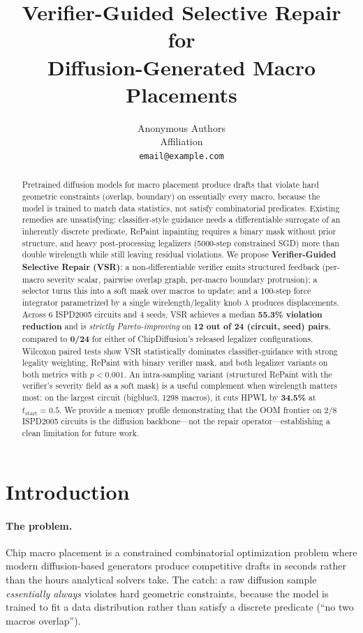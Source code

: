 \documentclass{article}
\title{Verifier-Guided Selective Repair for\\ Diffusion-Generated Macro Placements}
\author{%
  Anonymous Authors \\
  Affiliation \\
  \texttt{email@example.com} \\
}
\begin{document}
\maketitle

\begin{abstract}
Pretrained diffusion models for macro placement produce drafts that violate hard
geometric constraints (overlap, boundary) on essentially every macro, because
the model is trained to match data statistics, not satisfy combinatorial
predicates.  Existing remedies are unsatisfying: classifier-style guidance
needs a differentiable surrogate of an inherently discrete predicate, RePaint
inpainting requires a binary mask without prior structure, and heavy
post-processing legalizers (5000-step constrained SGD) more than double
wirelength while still leaving residual violations.  We propose
\textbf{Verifier-Guided Selective Repair (VSR)}: a non-differentiable verifier
emits structured feedback (per-macro severity scalar, pairwise overlap graph,
per-macro boundary protrusion); a selector turns this into a soft mask over
macros to update; and a 100-step force integrator parametrized by a single
wirelength/legality knob $\lambda$ produces displacements.  Across 6 ISPD2005
circuits and 4 seeds, VSR achieves a median \textbf{55.3\% violation
reduction} and is \emph{strictly Pareto-improving} on
\textbf{12 out of 24 (circuit, seed) pairs}, compared to \textbf{0/24} for
either of ChipDiffusion's released legalizer configurations.  Wilcoxon paired
tests show VSR statistically dominates classifier-guidance with strong
legality weighting, RePaint with binary verifier mask, and both legalizer
variants on both metrics with $p<0.001$.  An intra-sampling variant
(structured RePaint with the verifier's severity field as a soft mask) is a
useful complement when wirelength matters most: on the largest circuit
(bigblue3, 1298 macros), it cuts HPWL by \textbf{34.5\%} at $t_{\text{start}}=0.5$.
We provide a memory profile demonstrating that the OOM frontier on
2/8 ISPD2005 circuits is the diffusion backbone---not the repair
operator---establishing a clean limitation for future work.
\end{abstract}

\section{Introduction}

\paragraph{The problem.}  Chip macro placement is a constrained combinatorial
optimization problem where modern diffusion-based generators
\cite{chipdiffusion} produce competitive drafts in seconds rather than the
hours analytical solvers take.  The catch: a raw diffusion sample
\emph{essentially always} violates hard geometric constraints, because the
model is trained to fit a data distribution rather than satisfy a discrete
predicate (``no two macros overlap'').
\end{document}
